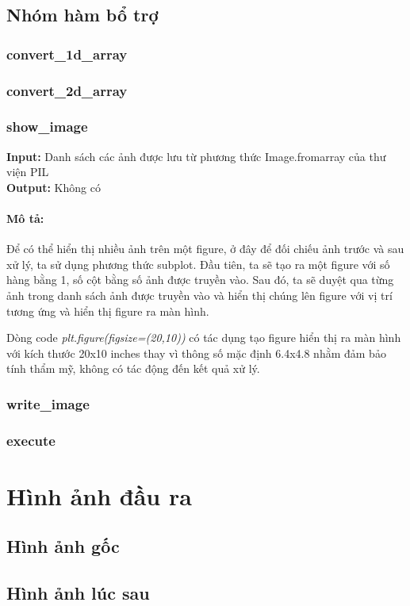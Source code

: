 \documentclass{article}
\begin{document}
\subsection{Nhóm hàm bổ trợ}
\subsubsection{convert\_1d\_array}
\subsubsection{convert\_2d\_array}
\subsubsection{show\_image}
\textbf{Input:} Danh sách các ảnh được lưu từ phương thức Image.fromarray của thư viện PIL \\
\textbf{Output:} Không có

\paragraph*{Mô tả:}
Để có thể hiển thị nhiều ảnh trên một figure, ở đây để đối chiếu ảnh trước và sau xử lý, ta sử dụng phương thức subplot. Đầu tiên, ta sẽ tạo ra một figure với số hàng bằng 1, số cột bằng số ảnh được truyền vào. Sau đó, ta sẽ duyệt qua từng ảnh trong danh sách ảnh được truyền vào và hiển thị chúng lên figure với vị trí tương ứng và hiển thị figure ra màn hình.

Dòng code \textit{plt.figure(figsize=(20,10))} có tác dụng tạo figure hiển thị ra màn hình với kích thước 20x10 inches thay vì thông số mặc định 6.4x4.8 nhằm đảm bảo tính thẩm mỹ, không có tác động đến kết quả xử lý.

\subsubsection{write\_image}
\subsubsection{execute}


\section{Hình ảnh đầu ra}
\subsection{Hình ảnh gốc}
\subsection{Hình ảnh lúc sau}
\end{document}
